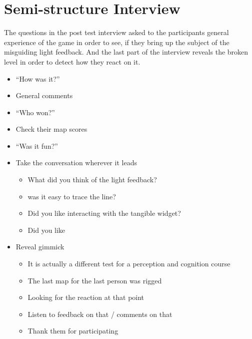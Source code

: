 \section*{Semi-structure Interview}\label{semi}
The questions in the post test interview asked to the participants general experience of the game in order to see, if they bring up the subject of the misguiding light feedback. And the last part of the interview reveals the broken level in order to detect how they react on it.
\begin{itemize}
\item “How was it?”
\item General comments
\item “Who won?”
\item Check their map scores
\item “Was it fun?”
\item Take the conversation wherever it leads
\begin{itemize}
\item What did you think of the light feedback?
\item was it easy to trace the line?
\item Did you like interacting with the tangible widget?
\item Did you like
\end{itemize}
\item Reveal gimmick
\begin{itemize}
\item It is actually a different test for a perception and cognition course
\item The last map for the last person was rigged
\item Looking for the reaction at that point
\item Listen to feedback on that / comments on that
\item Thank them for participating
\end{itemize}
\end{itemize}

